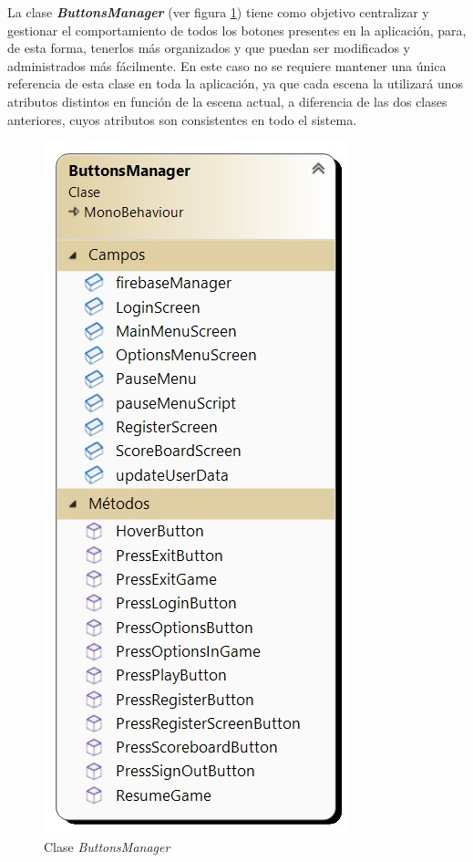 La clase \textbf{\textit{ButtonsManager}} (ver figura \ref{fig:ButtonsManager}) tiene como objetivo centralizar y gestionar el comportamiento de todos los botones presentes en la aplicación, para, de esta forma, tenerlos más organizados y que puedan ser modificados y administrados más fácilmente. En este caso no se requiere mantener una única referencia de esta clase en toda la aplicación, ya que cada escena la utilizará unos atributos distintos en función de la escena actual, a diferencia de las dos clases anteriores, cuyos atributos son consistentes en todo el sistema.
\begin{figure}[h]
	\centering
	\includegraphics[scale=0.45]{img/ButtonsManager.jpg}
	\caption{Clase \textit{ButtonsManager}}
	\label{fig:ButtonsManager}
    \end{figure}
